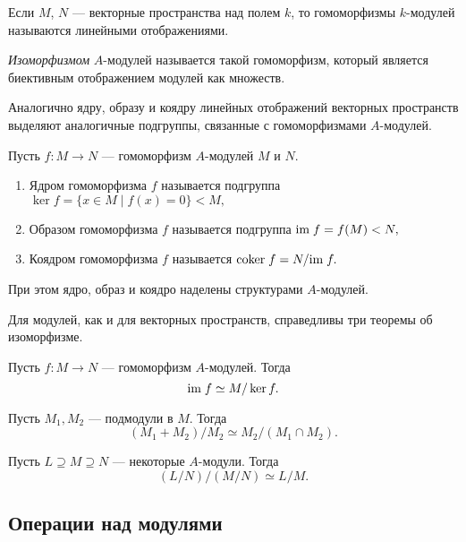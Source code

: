     Если $M$, $N$ --- векторные пространства над полем $k$, то гомоморфизмы $k$-модулей  называются линейными отображениями.

    \begin{Def}
        \textit{Изоморфизмом} $A$-модулей называется такой гомоморфизм, который является биективным отображением модулей как множеств.
    \end{Def}

    Аналогично ядру, образу и коядру линейных отображений векторных пространств выделяют аналогичные подгруппы, связанные с гомоморфизмами $A$-модулей.

    \begin{Def}
        Пусть $f : M \rightarrow N$ --- гомоморфизм $A$-модулей $M$ и $N$. 

        \begin{enumerate}
            \item Ядром гомоморфизма $f$ называется подгруппа $\ker{f} = \{x \in M \mid f(x) = 0\} < M,$
            \item Образом гомоморфизма $f$ называется подгруппа $\textup{im\;}f = f(M) < N,$
            \item Коядром гомоморфизма $f$ называется $\textup{coker\;}f = N/\textup{im\;}f.$
        \end{enumerate}
        При этом ядро, образ и коядро наделены структурами $A$-модулей.
    \end{Def}

    Для модулей, как и для векторных пространств, справедливы три теоремы об изоморфизме.

    \begin{Theorem}{\cite{A-M}}
        Пусть $f : M \rightarrow N$ --- гомоморфизм $A$-модулей. Тогда 
        $$
            \textup{im\;}f \simeq M / \ker{f}.
        $$
    \end{Theorem}
    \begin{Theorem}{\cite{A-M}}
        Пусть $M_1, M_2$ --- подмодули в $M$. Тогда
        $$
            (M_1 + M_2) / M_2 \simeq M_2 / (M_1 \cap M_2).
        $$
    \end{Theorem}
    \begin{Theorem}{\cite{A-M}}
        Пусть $L \supseteq M \supseteq N$ --- некоторые $A$-модули. Тогда
        $$
            (L/N)/(M/N) \simeq L/M.
        $$
    \end{Theorem}

    \subsection{Операции над модулями}

